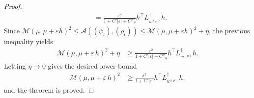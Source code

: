 \documentclass[10pt,a4paper]{amsart}
\newcommand{\Maas}{\mathcal{M}}
\begin{document}
\begin{proof}
\begin{align*}
            &= \frac{\varepsilon^2}{1 + C'|\varepsilon| + C''_{\eta}} h^\top L_{w^{(\mu)}}^{\dagger} h.
        \end{align*}
    Since $\Maas(\mu,\mu+\varepsilon h)^2 \leq \mathcal{A}((\psi_t),(\rho_t)) \leq \Maas(\mu,\mu+\varepsilon h)^2 + \eta$, the previous inequality yields
        \begin{align*}
            \Maas(\mu, \mu+\varepsilon \, h)^2 + \eta &\geq \frac{\varepsilon^2}{1 + C'|\varepsilon| + C''_{\eta}} h^\top L_{w^{(\mu)}}^{\dagger} h.
        \end{align*}
    Letting $\eta\to 0$ gives the desired lower bound
        \begin{align*}
            \Maas(\mu, \mu+\varepsilon \, h)^2 &\geq \frac{\varepsilon^2}{1 + C'|\varepsilon|} h^\top L_{w^{(\mu)}}^{\dagger} h,
        \end{align*}
    and the theorem is proved.
\end{proof}
\end{document}
